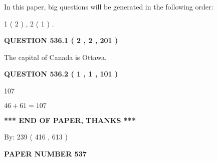 \documentclass[12pt]{article}
\begin{document}
   
   
\vspace{0.2in}
   
In this paper, big questions will be generated in the following order: 
   
   
   1 ( 2 )
 ,
   2 ( 1 )
 .
  
\vspace{0.2in}
  
{\textbf{\Large{QUESTION
536.1 
 ( 2 , 2 , 201 )
}}}
  
  
 
 
\noindent{}
 
 
The capital of Canada is Ottawa.
 
 
 
 
  
\vspace{0.2in}
  
{\textbf{\Large{QUESTION
536.2 
 ( 1 , 1 , 101 )
}}}
  
  
 
 
\noindent{}

107
 
 
 
 
\noindent{}

$ %
46 +  %
61=   %
107$
 
 
   
   
 \vspace{0.2in}
 
   
   
   
   
\vspace{1.0in} 
{\textbf{\large{ *** END OF PAPER, THANKS *** }}} 
   
   
\hspace{1.0in} By: 
 239 ( 416 ,  613 )
   
   
   
   
\newpage 
\setcounter{page}{ 
   537001 } 
   
   
   
   
 {\textbf{ \Large{ PAPER NUMBER  537  }}}
   
   
\vspace{0.2in}
   
   
   
\end{document}
